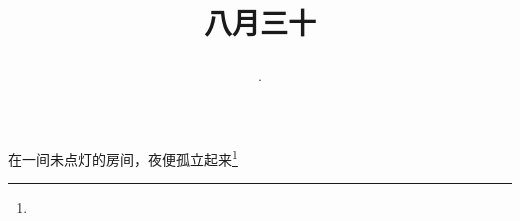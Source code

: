 \title{\date[d=2,m=10,y=2024][year:cn-y,年,month:cn,day:cn,日,·,weekday]·八月三十 }
在一间未点灯的房间，夜便孤立起来\footnote{ }


